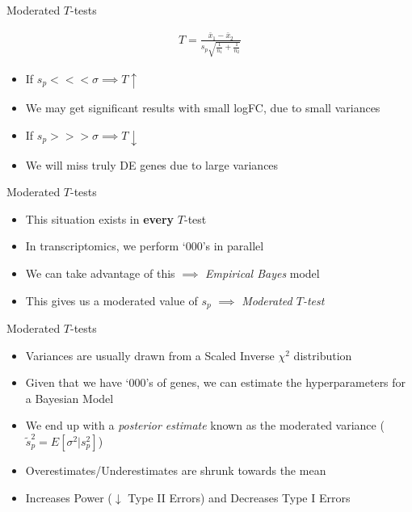 \documentclass[aspectratio=169,11pt]{beamer}
\begin{document}
\begin{frame}{Moderated $T$-tests}
	
	\begin{align*}
		T = \frac{\bar{x}_1 - \bar{x}_2}{s_p \sqrt{\frac{1}{n_1} + \frac{1}{n_2}}}
	\end{align*}
	
	\begin{itemize}
		\item If $s_p <<< \sigma \implies T\uparrow$ 
		\item We may get significant results with small logFC, due to small variances\\[2mm]
		\pause
		\item If $s_p >>> \sigma \implies T\downarrow$ 
		\item We will miss truly DE genes due to large variances
	\end{itemize}

\end{frame}

\begin{frame}{Moderated $T$-tests}

	\begin{itemize}
		\item This situation exists in \textbf{every} $T$-test
		\item In transcriptomics, we perform `000's in parallel
		\item We can take advantage of this $\implies$ \textit{Empirical Bayes} model
		\item This gives us a moderated value of $s_p$ $\implies$ \textit{Moderated $T$-test}
	\end{itemize}
	
\end{frame}

\begin{frame}{Moderated $T$-tests}	

		\begin{itemize}
			\item Variances are usually drawn from a Scaled Inverse $\chi^2$ distribution
			\item Given that we have `000's of genes, we can estimate the hyperparameters for a Bayesian Model
			\item We end up with a \textit{posterior estimate} known as the moderated variance ($\tilde{s}_p^2 = E[\sigma^2|s_p^2]$)
			\item Overestimates/Underestimates are shrunk towards the mean
			\item Increases Power ($\downarrow$ Type II Errors) and Decreases Type I Errors
		\end{itemize}

\end{frame}




\end{document}

